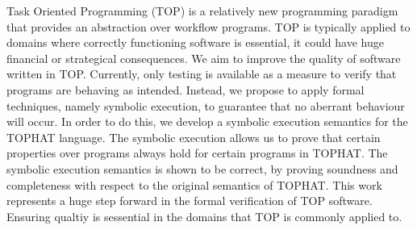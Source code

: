 
Task Oriented Programming (TOP) is a relatively new programming paradigm that provides an abstraction over workflow programs.
TOP is typically applied to domains where correctly functioning software is essential, it could have huge financial or strategical consequences.
We aim to improve the quality of software written in TOP.
Currently, only testing is available as a measure to verify that programs are behaving as intended.
Instead, we propose to apply formal techniques, namely symbolic execution, to guarantee that no aberrant behaviour will occur.
In order to do this, we develop a symbolic execution semantics for the TOPHAT language.
The symbolic execution allows us to prove that certain properties over programs always hold for certain programs in TOPHAT.
The symbolic execution semantics is shown to be correct, by proving soundness and completeness with respect to the original semantics of TOPHAT.
This work represents a huge step forward in the formal verification of TOP software.
Ensuring qualtiy is sessential in the domains that TOP is commonly applied to.


